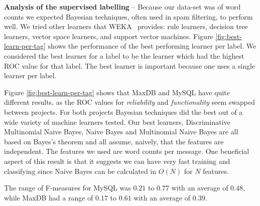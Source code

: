 \documentclass[]{sig-alternate}
\begin{document}
\textbf{Analysis of the supervised labelling} -- 
Because our data-set was of word counts we expected Bayesian techniques, often used in spam filtering, to perform well. 
We tried other learners that WEKA~\cite{weka09} provides: rule learners, decision tree learners, vector space learners, and support vector machines.  
Figure \ref{fig:best-learn-per-tag} shows the performance of the best performing learner per label. 
 We considered the best learner for a label to be the learner which
 had the highest ROC value for that label. 
The best learner is important because one uses a single learner per label.

Figure \ref{fig:best-learn-per-tag} shows that MaxDB and MySQL have quite different results, as the ROC values for \emph{reliability} and \emph{functionality} seem swapped between projects. 
For both projects Bayesian techniques did the best out of a wide variety of machine learners tested. 
Our best learners, Discriminative Multinomial Naive Bayes, Naive Bayes  and Multinomial Naive Bayes  are all based on Bayes's theorem and all assume, naively, that the features are independent. 
The features we used are word counts per message. 
One beneficial aspect of this result is that it suggests we can have very fast training and classifying  since Naive Bayes can be calculated in $O(N)$ for $N$ features.


The range of F-measures for MySQL was $0.21$ to $0.77$ with an average
of $0.48$, while MaxDB had a range of $0.17$ to $0.61$ with an average
of $0.39$.
\end{document}

